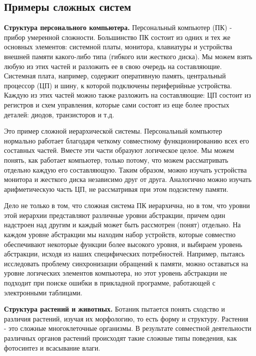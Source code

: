 \documentclass[a4paper,12pt]{article}
\begin{document}
\subsection{Примеры сложных систем}
\begin{small}
\parindent=1.25cm
\hspace{1.25 cm}
\textbf{Структура персонального компьютера.} Персональный компьютер (ПК) - прибор умеренной сложности. Большинство ПК состоит из одних и тех же основных элементов: системной платы, монитора, клавиатуры и устройства внешней памяти какого-либо типа (гибкого или жесткого диска). Мы можем взять любую из этих частей и разложить ее в свою очередь на составляющие. Системная плата, например, содержит оперативную память, центральный процессор (ЦП) и шину, к которой подключены периферийные устройства. Каждую из этих частей можно также разложить на составляющие: ЦП состоит из регистров и схем управления, которые сами состоят из еще более простых деталей: диодов, транзисторов и т.д. \par \medskip
Это пример сложной иерархической системы. Персональный компьютер нормально работает благодаря четкому совместному функционированию всех его составных частей. Вместе эти части образуют логическое целое. Мы можем понять, как работает компьютер, только потому, что можем рассматривать отдельно каждую его составляющую. Таким образом, можно изучать устройства монитора и жесткого диска независимо друг от друга. Аналогично можно изучать арифметическую часть ЦП, не рассматривая при этом подсистему памяти. \par \medskip
Дело не только в том, что сложная система ПК иерархична, но в том, что уровни этой иерархии представляют различные уровни абстракции, причем один надстроен над другим и каждый может быть рассмотрен (понят) отдельно. На каждом уровне абстракции мы находим набор устройств, которые совместно обеспечивают некоторые функции более высокого уровня, и выбираем уровень абстракции, исходя из наших специфических потребностей. Например, пытаясь исследовать проблему синхронизации обращений к памяти, можно оставаться на уровне логических элементов компьютера, но этот уровень абстракции не подходит при поиске ошибки в прикладной программе, работающей с электронными таблицами.\par \medskip
\textbf{Структура растений и животных.} Ботаник пытается понять сходство и различия растений, изучая их морфологию, то есть форму и структуру. Растения - это сложные многоклеточные организмы. В результате совместной деятельности различных органов растений происходят такие сложные типы поведения, как фотосинтез и всасывание влаги. \par \medskip

\end{small}
\end{document}
